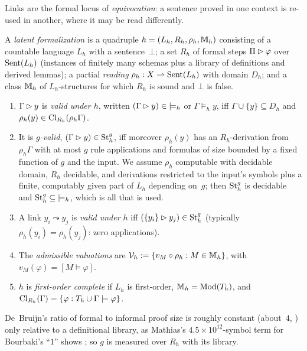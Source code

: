 Links are the formal locus of \emph{equivocation}: a sentence proved in one context is re-used in another, where it may be read differently.

\begin{definition}\label{def:informal:latent}
A \emph{latent formalization} is a quadruple $h=(L_h,R_h,\rho_h,\mathbb M_h)$ consisting of a countable language $L_h$ with a sentence~$\bot$; a set $R_h$ of formal steps $\Pi\rhd\varphi$ over $\mathrm{Sent}(L_h)$ (instances of finitely many schemas plus a library of definitions and derived lemmas); a partial \emph{reading} $\rho_h:X\rightharpoonup\mathrm{Sent}(L_h)$ with domain $D_h$; and a class $\mathbb M_h$ of $L_h$-structures for which $R_h$ is sound and $\bot$ is false.
\begin{enumerate}[label=(\roman*)]
\item $\Gamma\rhd y$ is \emph{valid under $h$}, written $(\Gamma\rhd y)\in{\models_h}$ or $\Gamma\models_hy$, iff $\Gamma\cup\{y\}\subseteq D_h$ and $\rho_h(y)\in\mathrm{Cl}_{R_h}(\rho_h\Gamma)$.
\item It is \emph{$g$-valid}, $(\Gamma\rhd y)\in\mathrm{St}^{g}_{h}$, iff moreover $\rho_h(y)$ has an $R_h$-derivation from $\rho_h\Gamma$ with at most $g$ rule applications and formulas of size bounded by a fixed function of $g$ and the input. We assume $\rho_h$ computable with decidable domain, $R_h$ decidable, and derivations restricted to the input's symbols plus a finite, computably given part of $L_h$ depending on~$g$; then $\mathrm{St}^{g}_{h}$ is decidable and $\mathrm{St}^{g}_{h}\subseteq{\models_h}$, which is all that is used.
\item A link $y_i\leadsto y_j$ is \emph{valid under $h$} iff $(\{y_i\}\rhd y_j)\in\mathrm{St}^{g}_{h}$ (typically $\rho_h(y_i)=\rho_h(y_j)$: zero applications).
\item The \emph{admissible valuations} are $\mathcal V_{h}:=\{v_M\circ\rho_h:M\in\mathbb M_h\}$, with $v_M(\varphi)=[M\models\varphi]$.
\item $h$ is \emph{first-order complete} if $L_h$ is first-order, $\mathbb M_h=\mathrm{Mod}(T_h)$, and $\mathrm{Cl}_{R_h}(\Gamma)=\{\varphi:T_h\cup\Gamma\models\varphi\}$.
\end{enumerate}
\end{definition}

De~Bruijn's ratio of formal to informal proof size is roughly constant (about~$4$, \citealt{wiedijk2000debruijn}) only relative to a definitional library, as Mathias's $4.5\times10^{12}$-symbol term for Bourbaki's ``$1$'' shows \citep{mathias2002term}; so $g$ is measured over $R_h$ with its library.

